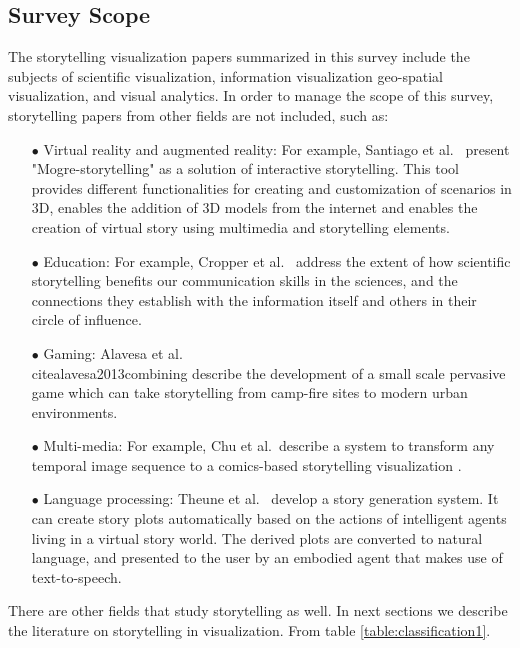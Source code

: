 \documentclass{egpubl}
\begin{document}
\subsection{Survey Scope}
The storytelling visualization papers summarized in this survey include the subjects of scientific visualization, information visualization geo-spatial visualization, and visual analytics. In order to manage the scope of this survey, storytelling papers from other fields are not included, such as:
\begin{enumerate}
	\item[$\bullet$] Virtual reality and augmented reality: For example, Santiago et al.\ \cite{santiago2014mogre} present "Mogre-storytelling" as a solution of interactive storytelling. This tool provides different functionalities for creating and customization of scenarios in 3D, enables the addition of 3D models from the internet and enables the creation of virtual story using multimedia and storytelling elements.
	\item[$\bullet$] Education:  For example, Cropper et al.\ \cite{cropper2015scientific} address the extent of how scientific storytelling benefits our communication skills in the sciences, and the connections they establish with the information itself and others in their circle of influence.
	\item[$\bullet$] Gaming: Alavesa et al.\\cite{alavesa2013combining} describe the development of a small scale pervasive game which can take storytelling from camp-fire sites to modern urban environments. 
	\item[$\bullet$] Multi-media: For example, Chu et al.\ describe a system to transform any temporal image sequence to a comics-based storytelling visualization \cite{chu2015}. 
	\item[$\bullet$] Language processing: Theune et al.\ \cite{theune2006generating} develop a story generation system. It can create story plots automatically based on the actions of intelligent agents living in a virtual story world. The derived plots are converted to natural language, and presented to the user by an embodied agent that makes use of text-to-speech.
\end{enumerate}
There are other fields that study storytelling as well. In next sections we describe the literature on storytelling in visualization. From table \ref{table:classification1}.
\end{document}
